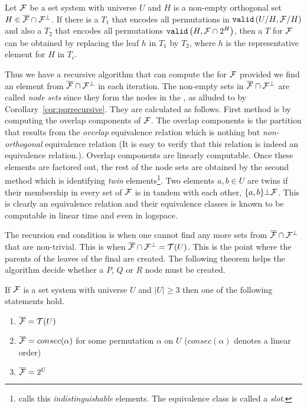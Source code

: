 \begin{corollary}[{\cite[Cor.~8]{mm96}}]
  \label{cor:pqrrecursive}
  Let ${\cal F}$ be a set system with universe $U$ and $H$ is a non-empty
  orthogonal set $H \in \overline{{\cal F}} \cap {\cal F}^{\bot}$. If there is a \PQRtree $T_1$ that
  encodes all permutations in ${\tt valid}\left(U/H, {\cal F}/H\right)$ and also a \PQRtree
  $T_2$ that encodes all permutations ${\tt valid}\left(H,{\cal F} \cap 2^{H}\right)$,
  then a \PQRtree $T$ for ${\cal F}$ can be obtained by replacing the leaf
  $h$ in $T_1$ by $T_2$, where $h$ is the representative element for
  $H$ in $T_i$.
\end{corollary}


Thus we have a recursive algorithm that can compute the \PQRtree for
${\cal F}$ provided we find an element from $\overline{{\cal F}} \cap {\cal F}^{\bot}$ in each iteration. The
non-empty sets in $\overline{{\cal F}} \cap {\cal F}^{\bot}$ are called {\em node sets} since they form the
nodes in the \PQRtree, as alluded to by
Corollary~\ref{cor:pqrrecursive}. They are calculated as follows.
First method is by computing the overlap components of ${\cal F}$. The
overlap components is the partition that results from the {\em
  overlap} equivalence relation which is nothing but {\em
  non-orthogonal} equivalence relation (It is easy to verify
  that this relation is indeed an equivalence relation.). Overlap
components are linearly computable\cite{mm95,wlh92}. Once these
elements are factored out, the rest of the node sets are obtained by
the second method which is identifying {\em twin}
elements\footnote{\cite[Sec.~3]{kklv10} calls this {\em indistinguishable}
  elements. The equivalence class is called a {\em slot}.}. Two
elements $a, b \in U$ are twins if their membership in every set of
${\cal F}$ is in tandem with each other, \ie $\{a,b\} \bot {\cal F}$. This is
clearly an equivalence relation and their equivalence classes is known
to be computable in linear time\cite{wlh01} and even in
logspace\cite{kklv10}.

The recursion end condition is when one cannot find any more sets from
$\overline{{\cal F}} \cap {\cal F}^{\bot}$ that are non-trivial. This is when $\overline{{\cal F}} \cap {\cal F}^{\bot} = {\cal T}(U)$. This is the
point where the parents of the leaves of the final \PQRtree are created. The
following theorem helps the algorithm decide whether a $P$, $Q$ or
$R$ node must be created.

\begin{theoremsansproof}[{\cite[Th.~9]{mm96}}] %
\label{th:pqrfinalmm}
If ${\cal F}$ is a set system with universe $U$ and $|U| \ge 3$ then one of
the following statements hold.
\begin{enumerate}
\item \label{th::it1} $\overline{{\cal F}} = {\cal T}(U)$ 
\item \label{th::it2}$\overline{{\cal F}} = consec(\alpha)$ for
  some permutation $\alpha$ on $U$ ($consec(\alpha)$ denotes a linear order)
\item \label{th::it3}$\overline{{\cal F}} = 2^{U}$ 
\end{enumerate}
\end{theoremsansproof}

